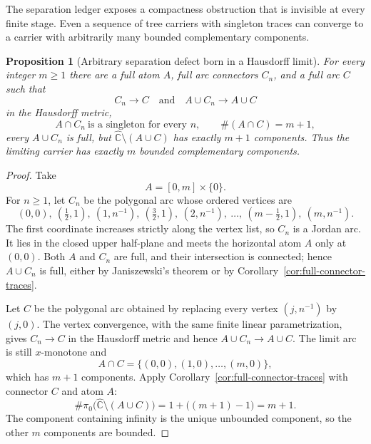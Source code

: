 \documentclass[11pt,reqno]{amsart}
\newtheorem{proposition}[theorem]{Proposition}
\theoremstyle{definition}
\theoremstyle{remark}
\newcommand{\Chat}{\widehat{\mathbb C}}
\begin{document}
The separation ledger exposes a compactness obstruction that is invisible at
every finite stage.  Even a sequence of tree carriers with singleton traces
can converge to a carrier with arbitrarily many bounded complementary
components.

\begin{proposition}[Arbitrary separation defect born in a Hausdorff limit]
\label{prop:trace-birth}
For every integer $m\ge1$ there are a full atom $A$, full arc connectors
$C_n$, and a full arc $C$ such that
\[
 C_n\longrightarrow C
 \quad\text{and}\quad
 A\cup C_n\longrightarrow A\cup C
\]
in the Hausdorff metric,
\[
 A\cap C_n\ \text{is a singleton for every }n,
\qquad
 \#(A\cap C)=m+1,
\]
every $A\cup C_n$ is full, but $\Chat\setminus(A\cup C)$ has exactly
$m+1$ components.  Thus the limiting carrier has exactly $m$ bounded
complementary components.
\end{proposition}

\begin{proof}
Take
\[
 A=[0,m]\times\{0\}.
\]
For $n\ge1$, let $C_n$ be the polygonal arc whose ordered vertices are
\[
 (0,0),\
 \left(\tfrac12,1\right),\ (1,n^{-1}),\
 \left(\tfrac32,1\right),\ (2,n^{-1}),\ \dots,\
 \left(m-\tfrac12,1\right),\ (m,n^{-1}).
\]
The first coordinate increases strictly along the vertex list, so $C_n$ is
a Jordan arc.  It lies in the closed upper half-plane and meets the
horizontal atom $A$ only at $(0,0)$.  Both $A$ and $C_n$ are full, and their
intersection is connected; hence $A\cup C_n$ is full, either by
Janiszewski's theorem or by
Corollary~\ref{cor:full-connector-traces}.

Let $C$ be the polygonal arc obtained by replacing every vertex
$(j,n^{-1})$ by $(j,0)$.  The vertex convergence, with the same finite
linear parametrization, gives $C_n\to C$ in the Hausdorff metric and hence
$A\cup C_n\to A\cup C$.  The limit arc is still $x$-monotone and
\[
 A\cap C=\{(0,0),(1,0),\dots,(m,0)\},
\]
which has $m+1$ components.  Apply
Corollary~\ref{cor:full-connector-traces} with connector $C$ and atom $A$:
\[
 \#\pi_0\bigl(\Chat\setminus(A\cup C)\bigr)
 =1+\bigl((m+1)-1\bigr)=m+1.
\]
The component containing infinity is the unique unbounded component, so
the other $m$ components are bounded.
\end{proof}
\end{document}
